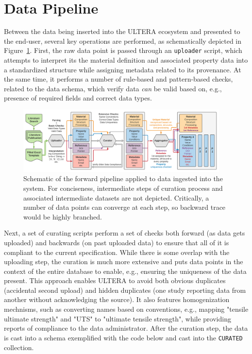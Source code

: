 \section{Data Pipeline} \label{ultera:sec:pipeline}

Between the data being inserted into the ULTERA ecosystem and presented to the end-user, several key operations are performed, as schematically depicted in Figure~\ref{ultera:fig:datapipeline}. First, the raw data point is passed through an \texttt{uploader} script, which attempts to interpret its the material definition and associated property data into a standardized structure while assigning metadata related to its provenance. At the same time, it performs a number of rule-based and pattern-based checks, related to the data schema, which verify data \emph{can} be valid based on, e.g., presence of required fields and correct data types.


\begin{figure}[H]
    \centering
    \includegraphics[width=0.95\textwidth]{ultera/ULTERADataDetail.png}
    \caption{Schematic of the forward pipeline applied to data ingested into the system. For conciseness, intermediate steps of curation process and associated intermediate datasets are not depicted. Critically, a number of data points can converge at each step, so backward trace would be highly branched.}
    \label{ultera:fig:datapipeline}
\end{figure}

Next, a set of curating scripts perform a set of checks both forward (as data gets uploaded) and backwards (on past uploaded data) to ensure that all of it is compliant to the current specification. While there is some overlap with the uploading step, the curation is much more extensive and puts data points in the context of the entire database to enable, e.g., ensuring the uniqueness of the data present. This approach enables ULTERA to avoid both obvious duplicates (accidental second upload) and hidden duplicates (one study reporting data from another without acknowledging the source). It also features homogenization mechnisms, such as converting names based on conventions, e.g., mapping "tensile ultimate strength" and "UTS" to "ultimate tensile strength", while providing reports of compliance to the data administrator. After the curation step, the data is cast into a schema exemplified with the code below and cast into the \texttt{CURATED} collection.

